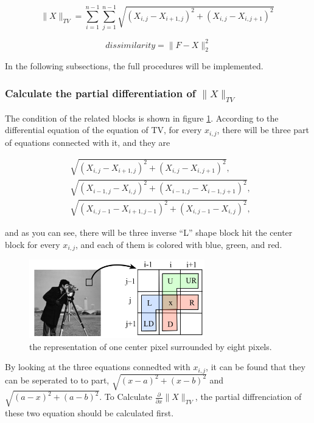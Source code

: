 \documentclass{article}
\begin{document}
$$
\|X\|_{T V}=\sum_{i=1}^{n-1} \sum_{j=1}^{n-1} \sqrt{\left(X_{i, j}-X_{i+1, j}\right)^{2}+\left(X_{i, j}-X_{i, j+1}\right)^{2}}\
$$


$$
dissimilarity = \|F-X\|_{2}^{2}
$$

In the following subsections, the full procedures will be implemented.



\subsubsection{Calculate the partial differentiation of $\|X\|_{T V}$}



The condition of the related blocks is shown in figure \ref{img5}. According to the differential equation of the equation of TV, for every $x_{i,j}$, there will be three part of equations connected with it, and they are

\begin{equation*}%
\begin{split}
&\sqrt{\left(X_{i, j}-X_{i+1, j}\right)^{2}+\left(X_{i, j}-X_{i, j+1}\right)^{2}},\ \\
&\sqrt{\left(X_{i-1, j}-X_{i, j}\right)^{2}+\left(X_{i-1, j}-X_{i-1, j+1}\right)^{2}},\ \\
&\sqrt{\left(X_{i, j-1}-X_{i+1, j-1}\right)^{2}+\left(X_{i, j-1}-X_{i, j}\right)^{2}},\
\end{split}
\end{equation*}


and as you can see, there will be three inverse “L” shape block hit the center block for every $x_{i,j}$, and each of them is colored with blue, green, and red.


\begin{figure}[h]
  \includegraphics[width=3in]{pic5.png}
  \centering
  \caption{the representation of one center pixel surrounded by eight pixels.}
  \label{img5}
\end{figure}

By looking at the three equations connedted with $x_{i,j}$, it can be found that they can be seperated to to part, $\sqrt{(x-a)^{2}+(x-b)^{2}}$ and $\sqrt{(a-x)^{2}+(a-b)^{2}}$. To Calculate $\frac{\partial}{\partial x}\|X\|_{T V}$, the partial diffrenciation of these two equation should be calculated first.
\end{document}

